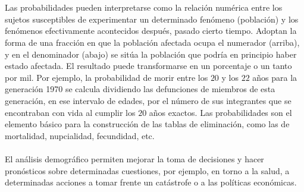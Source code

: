 \\\\
Las probabilidades pueden interpretarse como la relación numérica entre los sujetos susceptibles de experimentar un determinado fenómeno (población) y los fenómenos efectivamente acontecidos después, pasado cierto tiempo. Adoptan la forma de una fracción en que la población afectada ocupa el numerador (arriba), y en el denominador (abajo) se sitúa la población que podría en principio haber estado afectada. El resultado puede transformarse en un porcentaje o un tanto por mil. Por ejemplo, la probabilidad de morir entre los $20$ y los $22$ años para la generación 1970 se calcula dividiendo las defunciones de miembros de esta generación, en ese intervalo de edades, por el número de sus integrantes que se encontraban con vida al cumplir los $20$ años exactos. Las probabilidades son el elemento básico para la construcción de las tablas de eliminación, como las de mortalidad, nupcialidad, fecundidad, etc.\\\\
El análisis demográfico permiten mejorar la toma de decisiones y hacer pronósticos sobre determinadas cuestiones, por ejemplo, en torno a la salud, a determinadas acciones a tomar frente un catástrofe o a las políticas económicas.
